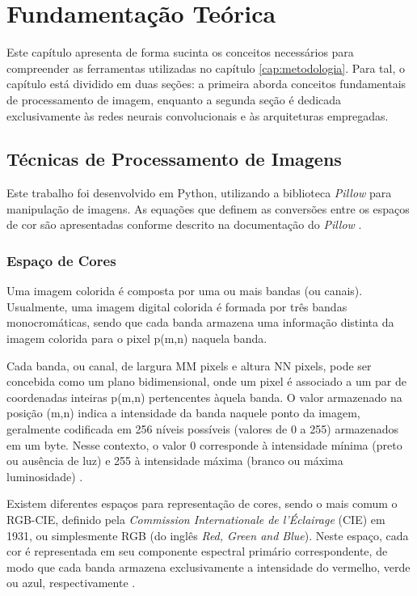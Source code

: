 \chapter{Fundamentação Teórica}\label{cap:fundamentação}

Este capítulo apresenta de forma sucinta os conceitos necessários para compreender as ferramentas utilizadas no capítulo \ref{cap:metodologia}.
Para tal, o capítulo está dividido em duas seções: a primeira aborda conceitos fundamentais de processamento de imagem,
enquanto a segunda seção é dedicada exclusivamente às redes neurais convolucionais e às arquiteturas empregadas.

\section{Técnicas de Processamento de Imagens}

Este trabalho foi desenvolvido em Python, utilizando a biblioteca \textit{Pillow} para manipulação de imagens.
As equações que definem as conversões entre os espaços de cor são apresentadas conforme descrito na documentação do \textit{Pillow} \cite{clark2015pillow}.

\subsection{Espaço de Cores}
Uma imagem colorida é composta por uma ou mais bandas (ou canais).
Usualmente, uma imagem digital colorida é formada por três bandas monocromáticas, sendo que cada banda armazena uma informação distinta da imagem colorida para o pixel p(m,n) naquela banda.

Cada banda, ou canal, de largura MM pixels e altura NN pixels, pode ser concebida como um plano bidimensional, onde um pixel é associado a um par de coordenadas inteiras p(m,n) pertencentes àquela banda.
O valor armazenado na posição (m,n) indica a intensidade da banda naquele ponto da imagem, geralmente codificada em 256 níveis possíveis (valores de 0 a 255) armazenados em um byte.
Nesse contexto, o valor 0 corresponde à intensidade mínima (preto ou ausência de luz) e 255 à intensidade máxima (branco ou máxima luminosidade) \cite{jaelim, shapiro}.

Existem diferentes espaços para representação de cores, sendo o mais comum o RGB-CIE, definido pela \textit{Commission Internationale de l'Éclairage} (CIE) em 1931, ou simplesmente RGB (do inglês \textit{Red, Green and Blue}).
Neste espaço, cada cor é representada em seu componente espectral primário correspondente, de modo que cada banda armazena exclusivamente a intensidade do vermelho, verde ou azul, respectivamente \cite{gonzalez, jaelim}.

